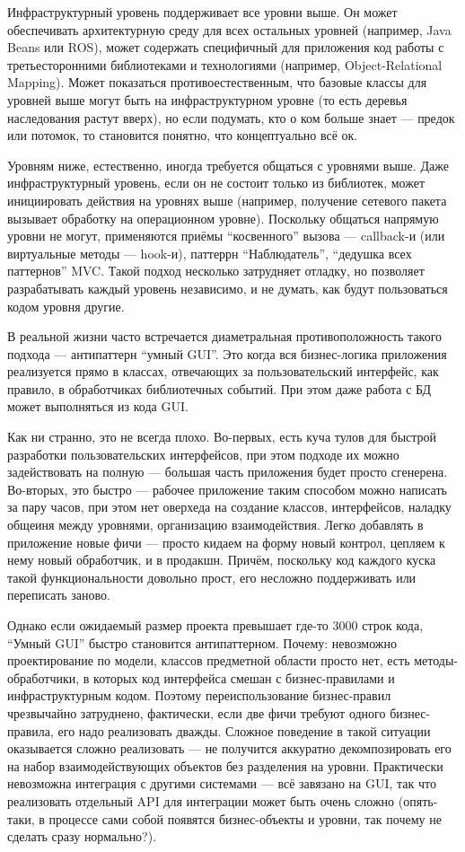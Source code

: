\documentclass[a5paper]{article}
\begin{document}
Инфраструктурный уровень поддерживает все уровни выше. Он может обеспечивать архитектурную среду для всех остальных уровней (например, Java Beans или ROS), может содержать специфичный для приложения код работы с третьесторонними библиотеками и технологиями (например, Object-Relational Mapping). Может показаться противоестественным, что базовые классы для уровней выше могут быть на инфраструктурном уровне (то есть деревья наследования растут вверх), но если подумать, кто о ком больше знает --- предок или потомок, то становится понятно, что концептуально всё ок.

Уровням ниже, естественно, иногда требуется общаться с уровнями выше. Даже инфраструктурный уровень, если он не состоит только из библиотек, может инициировать действия на уровнях выше (например, получение сетевого пакета вызывает обработку на операционном уровне). Поскольку общаться напрямую уровни не могут, применяются приёмы ``косвенного'' вызова --- callback-и (или виртуальные методы --- hook-и), паттеррн ``Наблюдатель'', ``дедушка всех паттернов'' MVC. Такой подход несколько затрудняет отладку, но позволяет разрабатывать каждый уровень независимо, и не думать, как будут пользоваться кодом уровня другие.

В реальной жизни часто встречается диаметральная противоположность такого подхода --- антипаттерн ``умный GUI''. Это когда вся бизнес-логика приложения реализуется прямо в классах, отвечающих за пользовательский интерфейс, как правило, в обработчиках библиотечных событий. При этом даже работа с БД может выполняться из кода GUI.

Как ни странно, это не всегда плохо. Во-первых, есть куча тулов для быстрой разработки пользовательских интерфейсов, при этом подходе их можно задействовать на полную --- большая часть приложения будет просто сгенерена. Во-вторых, это быстро --- рабочее приложение таким способом можно написать за пару часов, при этом нет оверхеда на создание классов, интерфейсов, наладку общеиня между уровнями, организацию взаимодействия. Легко добавлять в приложение новые фичи --- просто кидаем на форму новый контрол, цепляем к нему новый обработчик, и в продакшн. Причём, поскольку код каждого куска такой функциональности довольно прост, его несложно поддерживать или переписать заново.

Однако если ожидаемый размер проекта превышает где-то 3000 строк кода, ``Умный GUI'' быстро становится антипаттерном. Почему: невозможно проектирование по модели, классов предметной области просто нет, есть методы-обработчики, в которых код интерфейса смешан с бизнес-правилами и инфраструктурным кодом. Поэтому переиспользование бизнес-правил чрезвычайно затруднено, фактически, если две фичи требуют одного бизнес-правила, его надо реализовать дважды. Сложное поведение в такой ситуации оказывается сложно реализовать --- не получится аккуратно декомпозировать его на набор взаимодействующих объектов без разделения на уровни. Практически невозможна интеграция с другими системами --- всё завязано на GUI, так что реализовать отдельный API для интеграции может быть очень сложно (опять-таки, в процессе сами собой появятся бизнес-объекты и уровни, так почему не сделать сразу нормально?).
\end{document}
